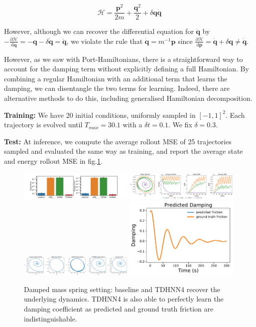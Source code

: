 \documentclass[twoside]{article}
\begin{document}
\begin{equation}
\mathcal{H} =\frac{ \mathbf{p}^2}{2m} + \frac{\mathbf{q}^2}{2} + \delta \mathbf{q} \dot{\mathbf{q}}
\end{equation}

However, although we can recover the differential equation for $\ddot{\mathbf{q}}$ by $-\frac{\partial\mathcal{H}}{\mathrm{d}\mathbf{q}}  =-\mathbf{q} - \delta\dot{\mathbf{q}} = \ddot{\mathbf{q}}$, we violate the rule that $\dot{\mathbf{q}} = m^{-1}\mathbf{p}$ since $ \frac{\partial\mathcal{H}}{\mathrm{d}\mathbf{p}} =  \dot{\mathbf{q}} +\delta \mathbf{q} \neq \dot{\mathbf{q}} $.


However, as we saw with Port-Hamiltonians, there is a straightforward way to account for the damping term without explicitly defining a full Hamiltonian. By combining a regular Hamiltonian with an additional term that learns the damping, we can disentangle the two terms for learning. Indeed, there are alternative methods to do this, including generalised Hamiltonian decomposition.

\textbf{Training:} We have 20 initial conditions, uniformly sampled in $[-1,1]^2$. Each trajectory is evolved until $T_{max} = 30.1$ with a $\delta t = 0.1$. We fix $\delta = 0.3$.

\textbf{Test:} At inference, we compute the average rollout MSE of 25 trajectories sampled and evaluated the same way as training, and report the average state and energy rollout MSE in fig.\ref{damped}.

\begin{figure}[h!]
\centering
\includegraphics[width=0.49\textwidth]{figures/damped_1_errors.pdf}
\includegraphics[width=0.49\textwidth]{figures/damped_1_pred.pdf}
\includegraphics[width=0.49\textwidth]{figures/damped_rollout.pdf}
\includegraphics[width=0.49\textwidth]{figures/TDHNN4_damped_1.pdf}
\caption{Damped mass spring setting: baseline and TDHNN4 recover the underlying dynamics. TDHNN4 is also able to perfectly learn the damping coefficient as predicted and ground truth friction are indistinguishable.}
\label{damped}
\end{figure}
\end{document}
